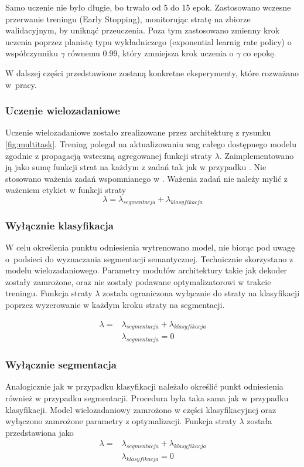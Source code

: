 Samo uczenie nie było długie, bo trwało od 5 do 15 epok. Zastosowano wczesne przerwanie treningu (Early Stopping), monitorując stratę na zbiorze walidacyjnym, by uniknąć przeuczenia. Poza tym zastosowano zmienny krok uczenia poprzez planistę typu wykładniczego (exponential learnig rate policy) o współczynniku $\gamma$ równemu 0.99, który zmniejsza krok uczenia o $\gamma$ co epokę.

W dalszej części przedstawione zostaną konkretne eksperymenty, które rozważano w~pracy.

\subsubsection{Uczenie wielozadaniowe}
Uczenie wielozadaniowe zostało zrealizowane przez architekturę z rysunku \ref{fig:multitask}. Trening polegał na aktualizowaniu wag całego dostępnego modelu zgodnie z propagacją wsteczną agregowanej funkcji straty $\lambda$. Zaimplementowano ją jako sumę funkcji strat na każdym z zadań tak jak w przypadku \cite{mehta2018net}. Nie stosowano ważenia zadań wspomnianego w \cite{9892852}. Ważenia zadań nie należy mylić z ważeniem etykiet w funkcji straty
\begin{equation*}
\lambda = \lambda_{segmentacja} + \lambda_{klasyfikacja}
\end{equation*}

\subsubsection{Wyłącznie klasyfikacja}
W celu określenia punktu odniesienia wytrenowano model, nie biorąc pod uwagę o~podsieci do wyznaczania segmentacji semantycznej. Technicznie skorzystano z modelu wielozadaniowego. Parametry modułów architektury takie jak dekoder zostały zamrożone, oraz nie zostały podawane optymalizatorowi w trakcie treningu. Funkcja straty $\lambda$ została ograniczona wyłącznie do straty na klasyfikacji poprzez wyzerowanie w każdym kroku straty na segmentacji.

\begin{align*}
\lambda  = & \lambda_{segmentacja} + \lambda_{klasyfikacja} \\
           & \lambda_{segmentacja} = 0
\end{align*}
\subsubsection{Wyłącznie segmentacja}
Analogicznie jak w przypadku klasyfikacji należało określić punkt odniesienia również w przypadku segmentacji. Procedura była taka sama jak w przypadku klasyfikacji. Model wielozadaniowy zamrożono w części klasyfikacyjnej oraz wyłączono zamrożone parametry z optymalizacji. Funkcja straty $\lambda$ została przedstawiona jako
\begin{align*}
\lambda = & \lambda_{segmentacja} + \lambda_{klasyfikacja} \\
          & \lambda_{klasyfikacja} = 0
\end{align*}
